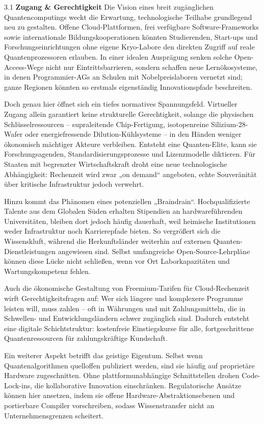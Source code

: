 3.1 \textbf{Zugang \& Gerechtigkeit} 
Die Vision eines breit zugänglichen Quantencomputings weckt die Erwartung, technologische Teilhabe grundlegend neu zu gestalten. Offene Cloud-Plattformen, frei verfügbare Software-Frameworks sowie internationale Bildungskooperationen könnten Studierenden, Start-ups und Forschungseinrichtungen ohne eigene Kryo-Labore den direkten Zugriff auf reale Quantenprozessoren erlauben. In einer idealen Ausprägung senken solche Open-Access-Wege nicht nur Eintrittsbarrieren, sondern schaffen neue Lernökosysteme, in denen Programmier-AGs an Schulen mit Nobelpreislaboren vernetzt sind; ganze Regionen könnten so erstmals eigenständig Innovationspfade beschreiten.

Doch genau hier öffnet sich ein tiefes normatives Spannungsfeld. Virtueller Zugang allein garantiert keine strukturelle Gerechtigkeit, solange die physischen Schlüsselressourcen – supraleitende Chip-Fertigung, isotopenreine Silizium-28-Wafer oder energiefressende Dilution-Kühlsysteme – in den Händen weniger ökonomisch mächtiger Akteure verbleiben. Entsteht eine Quanten-Elite, kann sie Forschungsagenden, Standardisierungsprozesse und Lizenzmodelle diktieren. Für Staaten mit begrenzter Wirtschaftskraft droht eine neue technologische Abhängigkeit: Rechenzeit wird zwar „on demand“ angeboten, echte Souveränität über kritische Infrastruktur jedoch verwehrt.

Hinzu kommt das Phänomen eines potenziellen „Braindrain“. Hochqualifizierte Talente aus dem Globalen Süden erhalten Stipendien an hardwareführenden Universitäten, bleiben dort jedoch häufig dauerhaft, weil heimische Institutionen weder Infrastruktur noch Karrierepfade bieten. So vergrößert sich die Wissenskluft, während die Herkunftsländer weiterhin auf externen Quanten-Dienstleistungen angewiesen sind. Selbst umfangreiche Open-Source-Lehrpläne können diese Lücke nicht schließen, wenn vor Ort Laborkapazitäten und Wartungskompetenz fehlen.

Auch die ökonomische Gestaltung von Freemium-Tarifen für Cloud-Rechenzeit wirft Gerechtigkeitsfragen auf: Wer sich längere und komplexere Programme leisten will, muss zahlen – oft in Währungen und mit Zahlungsmitteln, die in Schwellen- und Entwicklungsländern schwer zugänglich sind. Dadurch entsteht eine digitale Schichtstruktur: kostenfreie Einstiegskurse für alle, fortgeschrittene Quantenressourcen für zahlungskräftige Kundschaft.

Ein weiterer Aspekt betrifft das geistige Eigentum. Selbst wenn Quantenalgorithmen quelloffen publiziert werden, sind sie häufig auf proprietäre Hardware zugeschnitten. Ohne plattformunabhängige Schnittstellen drohen Code-Lock-ins, die kollaborative Innovation einschränken. Regulatorische Ansätze können hier ansetzen, indem sie offene Hardware-Abstraktionsebenen und portierbare Compiler vorschreiben, sodass Wissenstransfer nicht an Unternehmensgrenzen scheitert.

